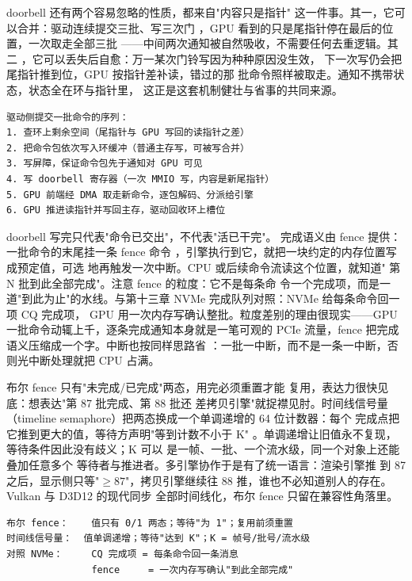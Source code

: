 doorbell 还有两个容易忽略的性质，都来自"内容只是指针"
这一件事。其一，它可以合并：驱动连续提交三批、写三次门
，GPU 看到的只是尾指针停在最后的位置，一次取走全部三批
——中间两次通知被自然吸收，不需要任何去重逻辑。其二
，它可以丢失后自愈：万一某次门铃写因为种种原因没生效，
下一次写仍会把尾指针推到位，GPU 按指针差补读，错过的那
批命令照样被取走。通知不携带状态，状态全在环与指针里，
这正是这套机制健壮与省事的共同来源。

\begin{lstlisting}
驱动侧提交一批命令的序列：
1. 查环上剩余空间（尾指针与 GPU 写回的读指针之差）
2. 把命令包依次写入环缓冲（普通主存写，可被写合并）
3. 写屏障，保证命令包先于通知对 GPU 可见
4. 写 doorbell 寄存器（一次 MMIO 写，内容是新尾指针）
5. GPU 前端经 DMA 取走新命令，逐包解码、分派给引擎
6. GPU 推进读指针并写回主存，驱动回收环上槽位
\end{lstlisting}

doorbell 写完只代表"命令已交出"，不代表"活已干完"。
完成语义由 fence 提供：一批命令的末尾挂一条 fence 命令
，引擎执行到它，就把一块约定的内存位置写成预定值，可选
地再触发一次中断。CPU 或后续命令流读这个位置，就知道"
第 N 批到此全部完成"。注意 fence 的粒度：它不是每条命
令一个完成项，而是一道"到此为止"的水线。与第十三章
NVMe 完成队列对照：NVMe 给每条命令回一项 CQ 完成项，
GPU 用一次内存写确认整批。粒度差别的理由很现实——GPU
一批命令动辄上千，逐条完成通知本身就是一笔可观的 PCIe
流量，fence 把完成语义压缩成一个字。中断也按同样思路省
：一批一中断，而不是一条一中断，否则光中断处理就把 CPU
占满。

布尔 fence 只有"未完成/已完成"两态，用完必须重置才能
复用，表达力很快见底：想表达"第 87 批完成、第 88 批还
差拷贝引擎"就捉襟见肘。时间线信号量（timeline
semaphore）把两态换成一个单调递增的 64 位计数器：每个
完成点把它推到更大的值，等待方声明"等到计数不小于 K"
。单调递增让旧值永不复现，等待条件因此没有歧义；K 可以
是一帧、一批、一个流水级，同一个对象上还能叠加任意多个
等待者与推进者。多引擎协作于是有了统一语言：渲染引擎推
到 87 之后，显示侧只等"$\geq87$"，拷贝引擎继续往 88
推，谁也不必知道别人的存在。Vulkan 与 D3D12 的现代同步
全部时间线化，布尔 fence 只留在兼容性角落里。

\begin{lstlisting}
布尔 fence：    值只有 0/1 两态；等待"为 1"；复用前须重置
时间线信号量：  值单调递增；等待"达到 K"；K = 帧号/批号/流水级
对照 NVMe：     CQ 完成项 = 每条命令回一条消息
               fence     = 一次内存写确认"到此全部完成"
\end{lstlisting}


